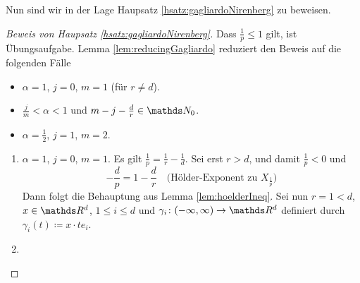 Nun sind wir in der Lage Haupsatz \ref{hsatz:gagliardoNirenberg} zu beweisen.

\begin{proof}[Beweis von Haupsatz \ref{hsatz:gagliardoNirenberg}]
  Dass $\frac{1}{p} \leq 1$ gilt, ist Übungsaufgabe.
  Lemma \ref{lem:reducingGagliardo} reduziert den Beweis auf die folgenden Fälle
  \begin{itemize}
    \item $\alpha = 1$, $j = 0$, $m = 1$ (für $r \neq d$).
    \item $\frac{j}{m} < \alpha < 1$ und $m - j - \frac{d}{r} \in \N_0$.
    \item $\alpha = \frac{1}{2}$, $j = 1$, $m = 2$.
  \end{itemize}

  \begin{enumerate}
    \item $\alpha = 1$, $j = 0$, $m = 1$.
      Es gilt $\frac{1}{p} = \frac{1}{r} - \frac{1}{d}$.
      Sei erst $r > d$, und damit $\frac{1}{p} < 0$ und
      $$
      -\frac{d}{p} = 1 - \frac{d}{r} \quad\text{(Hölder-Exponent zu $X_{\frac{1}{p}}$)}
      $$
      Dann folgt die Behauptung aus Lemma \ref{lem:hoelderIneq}.
      Sei nun $r = 1 < d$, $x \in \R^d$, $1 \leq i \leq d$ und $\gamma_i \colon (-\infty, \infty) \to \R^d$ definiert durch $\gamma_i (t) \coloneqq x \cdot t e_i$.
    \item 
  \end{enumerate}

\end{proof}

